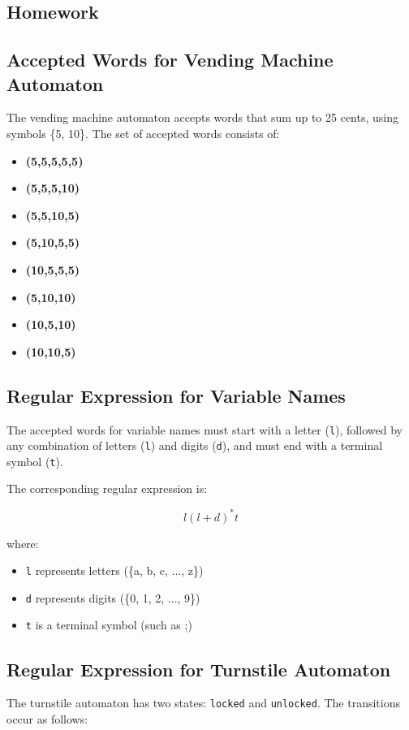 \documentclass{article}
\begin{document}
\subsection{Homework}

\subsection{Accepted Words for Vending Machine Automaton}
The vending machine automaton accepts words that sum up to 25 cents, using symbols \{5, 10\}. The set of accepted words consists of:

\begin{itemize}
    \item \textbf{(5,5,5,5,5)}
    \item \textbf{(5,5,5,10)}
    \item \textbf{(5,5,10,5)}
    \item \textbf{(5,10,5,5)}
    \item \textbf{(10,5,5,5)}
    \item \textbf{(5,10,10)}
    \item \textbf{(10,5,10)}
    \item \textbf{(10,10,5)}
\end{itemize}

\subsection{Regular Expression for Variable Names}
The accepted words for variable names must start with a letter (\texttt{l}), followed by any combination of letters (\texttt{l}) and digits (\texttt{d}), and must end with a terminal symbol (\texttt{t}).

The corresponding regular expression is:

\begin{equation}
    l (l + d)^* t
\end{equation}

where:
\begin{itemize}
    \item \texttt{l} represents letters (\{a, b, c, ..., z\})
    \item \texttt{d} represents digits (\{0, 1, 2, ..., 9\})
    \item \texttt{t} is a terminal symbol (such as ;)
\end{itemize}

\subsection{Regular Expression for Turnstile Automaton}
The turnstile automaton has two states: \texttt{locked} and \texttt{unlocked}. The transitions occur as follows:
\end{document}
